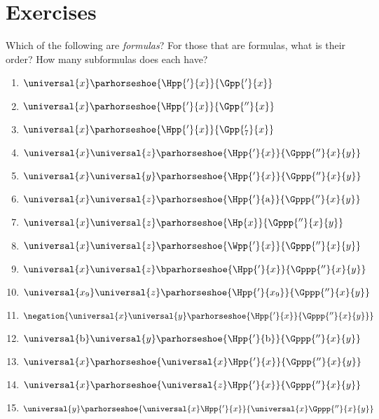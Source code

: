 \section{Exercises}

 Which of the following are \emph{formulas}? 
For those that are formulas, what is their order? 
How many subformulas does each have?
\begin{multicols}{2}
\begin{enumerate}
\item {$\universal{\variable{x}}\parhorseshoe{\Hpp{'}{\variable{x}}}{\Gpp{'}{\variable{x}}}$}
\item {$\universal{\variable{x}}\parhorseshoe{\Hpp{'}{\variable{x}}}{\Gpp{''}{\variable{x}}}$}
\item {$\universal{\variable{x}}\parhorseshoe{\Hpp{'}{\variable{x}}}{\Gpp{'_7}{\variable{x}}}$}
\item {$\universal{\variable{x}}\universal{\variable{z}}\parhorseshoe{\Hpp{'}{\variable{x}}}{\Gppp{''}{\variable{x}}{\variable{y}}}$}
\item {$\universal{\variable{x}}\universal{\variable{y}}\parhorseshoe{\Hpp{'}{\variable{x}}}{\Gppp{''}{\variable{x}}{\variable{y}}}$}
\item {$\universal{\variable{x}}\universal{\variable{z}}\parhorseshoe{\Hpp{'}{\constant{a}}}{\Gppp{''}{\variable{x}}{\variable{y}}}$}
\item {$\universal{\variable{x}}\universal{\variable{z}}\parhorseshoe{\Hp{\variable{x}}}{\Gppp{''}{\variable{x}}{\variable{y}}}$}
\item {$\universal{\variable{x}}\universal{\variable{z}}\parhorseshoe{\Wpp{'}{\variable{x}}}{\Gppp{''}{\variable{x}}{\variable{y}}}$}
\item {$\universal{\variable{x}}\universal{\variable{z}}\bparhorseshoe{\Hpp{'}{\variable{x}}}{\Gppp{''}{\variable{x}}{\variable{y}}}$}
\item {$\universal{\variable{x}_9}\universal{\variable{z}}\parhorseshoe{\Hpp{'}{\variable{x}_9}}{\Gppp{''}{\variable{x}}{\variable{y}}}$}
\item {$\negation{\universal{\variable{x}}\universal{\variable{y}}\parhorseshoe{\Hpp{'}{\variable{x}}}{\Gppp{''}{\variable{x}}{\variable{y}}}}$}
\item {$\universal{\constant{b}}\universal{\variable{y}}\parhorseshoe{\Hpp{'}{\constant{b}}}{\Gppp{''}{\variable{x}}{\variable{y}}}$}
\item {$\universal{\variable{x}}\parhorseshoe{\universal{\variable{x}}\Hpp{'}{x}}{\Gppp{''}{\variable{x}}{\variable{y}}}$}
\item {$\universal{\variable{x}}\parhorseshoe{\universal{\variable{z}}\Hpp{'}{x}}{\Gppp{''}{\variable{x}}{\variable{y}}}$}
\item {$\universal{\variable{y}}\parhorseshoe{\universal{\variable{x}}\Hpp{'}{x}}{\universal{\variable{x}}\Gppp{''}{\variable{x}}{\variable{y}}}$}
\end{enumerate}
\end{multicols}

